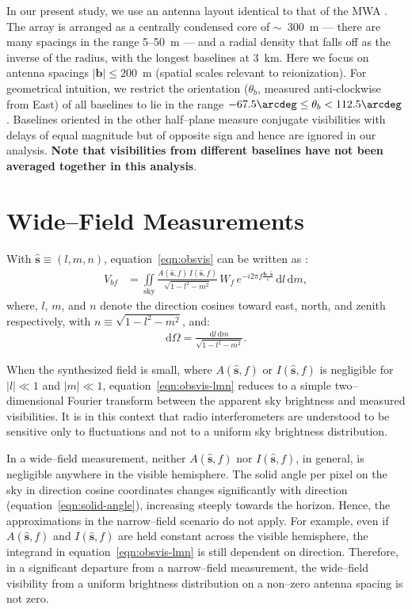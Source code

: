 \documentclass[preprint2,iop,numberedappendix]{emulateapj}
\newcommand{\dif}{\mathrm{d}}
\begin{document}
In our present study, we use an antenna layout identical to that of the MWA \citep{bea12}. The array is arranged as a centrally condensed core of $\sim$~300~m --- there are many spacings in the range 5--50~m --- and a radial density that falls off as the inverse of the radius, with the longest baselines at 3~km. Here we focus on antenna spacings $|\boldsymbol{b}| \le 200$~m (spatial scales relevant to reionization). For geometrical intuition, we restrict the orientation ($\theta_b$, measured anti-clockwise from East) of all baselines to lie in the range $-67.5\arcdeg \leq \theta_b < 112.5\arcdeg$. Baselines oriented in the other half--plane measure conjugate visibilities with delays of equal magnitude but of opposite sign and hence are ignored in our analysis. {\bf Note that visibilities from different baselines have not been averaged together in this analysis}. 

\section{Wide--Field Measurements}\label{sec:wide-field}

With $\hat{\boldsymbol{s}}\equiv (l,m,n)$, equation~\ref{eqn:obsvis} can be written as \citep{tay99,tho01}:
\begin{align}\label{eqn:obsvis-lmn}
  V_{bf} &= \iint\limits_\textrm{sky} \frac{A(\hat{\boldsymbol{s}},f)\,I(\hat{\boldsymbol{s}},f)}{\sqrt{1-l^2-m^2}}\,W_f\,e^{-i2\pi f\frac{\boldsymbol{b}\cdot\hat{\boldsymbol{s}}}{c}}\,\dif l\,\dif m, 
\end{align}
where, $l$, $m$, and $n$ denote the direction cosines toward east, north, and zenith respectively, with $n\equiv\sqrt{1-l^2-m^2}$, and:
\begin{align}\label{eqn:solid-angle}
  \dif\Omega = \frac{\dif l\,\dif m}{\sqrt{1-l^2-m^2}}.
\end{align}

When the synthesized field is small, where $A(\hat{\boldsymbol{s}},f)$ or $I(\hat{\boldsymbol{s}},f)$ is negligible for $|l| \ll 1$ and $|m| \ll 1$, equation~\ref{eqn:obsvis-lmn} reduces to a simple two--dimensional Fourier transform \citep{tay99,tho01} between the apparent sky brightness and measured visibilities. It is in this context that radio interferometers are understood to be sensitive only to fluctuations and not to a uniform sky brightness distribution. 

In a wide--field measurement, neither $A(\hat{\boldsymbol{s}},f)$ nor $I(\hat{\boldsymbol{s}},f)$, in general, is negligible anywhere in the visible hemisphere. The solid angle per pixel on the sky in direction cosine coordinates changes significantly with direction (equation~\ref{eqn:solid-angle}), increasing steeply towards the horizon. Hence, the approximations in the narrow--field scenario do not apply. For example, even if $A(\hat{\boldsymbol{s}},f)$ and $I(\hat{\boldsymbol{s}},f)$ are held constant across the visible hemisphere, the integrand in equation~\ref{eqn:obsvis-lmn} is still dependent on direction. Therefore, in a significant departure from a narrow--field measurement, the wide--field visibility from a uniform brightness distribution on a non--zero antenna spacing is not zero.
\end{document}
